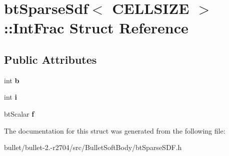 \hypertarget{structbt_sparse_sdf_1_1_int_frac}{\section{bt\+Sparse\+Sdf$<$ C\+E\+L\+L\+S\+I\+Z\+E $>$\+:\+:Int\+Frac Struct Reference}
\label{structbt_sparse_sdf_1_1_int_frac}
}
\subsection*{Public Attributes}
\begin{DoxyCompactItemize}
\item 
\hypertarget{structbt_sparse_sdf_1_1_int_frac_a2ba2d547c0a54c9a2f881fd291734d90}{int {\bfseries b}}\label{structbt_sparse_sdf_1_1_int_frac_a2ba2d547c0a54c9a2f881fd291734d90}

\item 
\hypertarget{structbt_sparse_sdf_1_1_int_frac_aac7871826d74a313a6147a93b674d550}{int {\bfseries i}}\label{structbt_sparse_sdf_1_1_int_frac_aac7871826d74a313a6147a93b674d550}

\item 
\hypertarget{structbt_sparse_sdf_1_1_int_frac_adf6a4b19e80b0dd76c3609d8f8ea5af9}{bt\+Scalar {\bfseries f}}\label{structbt_sparse_sdf_1_1_int_frac_adf6a4b19e80b0dd76c3609d8f8ea5af9}

\end{DoxyCompactItemize}


The documentation for this struct was generated from the following file\+:\begin{DoxyCompactItemize}
\item 
bullet/bullet-\/2.-\/r2704/src/\+Bullet\+Soft\+Body/bt\+Sparse\+S\+D\+F.\+h\end{DoxyCompactItemize}
